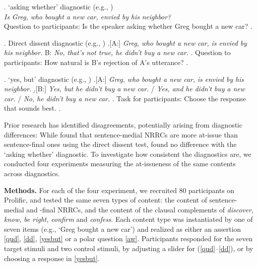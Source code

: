 \documentclass[11pt, a4paper]{article}
\newif\ifparens\parensfalse
\newcommand\pref[1]{{\parenstrue\ref{#1}}}
\begin{document}
  \ex. \label{aw}%
    `asking whether' diagnostic (e.g., \citealt{tonhauser2018projective,solstad2024cataphoric})\\
      \emph{Is Greg, who bought a new car, envied by his neighbor?}
  \\ Question to participants: Is the speaker asking whether Greg bought a new car?
  \z.

  \ex. \label{dd} Direct dissent diagnostic (e.g., \citealt{tonhauser2012diagnosing,syrett2015experimental})
    \a.[A:] \emph{Greg, who bought a new car, is envied by his neighbor.}
     \hfill 
      B: \hspace{.5em} \emph{No, that's not true, he didn't buy a new car.}
    \z.
  Question to participants: How natural is B's rejection of A's utterance?
  \z.

  \ex. \label{yesbut}%
    `yes, but' diagnostic (e.g., \citealt{xue2011correlation,destruel2015cross-linguistic})
    \a.[A:] \emph{Greg, who bought a new car, is envied by his neighbor.}
    \b.[B:] \emph{Yes, but he didn't buy a new car.} / \emph{Yes, and he didn't buy a new car.} / \emph{No, he didn't buy a new car.}
    \z.
    Task for participants: Choose the response that sounds best.
  \z.

  Prior research has identified disagreements, potentially arising from  diagnostic differences: While \citealt{syrett2015experimental} found that sentence-medial NRRCs are more at-issue than sentence-final ones using the direct dissent test, \citealt{drozdov2024projection} found no difference with the `asking whether' diagnostic. To investigate how consistent the diagnostics are, we conducted four experiments measuring the at-issueness of the same contents across diagnostics.

\vspace{.1\baselineskip} \noindent
{\bf Methods.}
  For each of the four experiment, we recruited 80 participants on Prolific, and tested the same seven types of content: the content of sentence-medial and -final NRRCs, and the content of the clausal complements of \emph{discover, know, be right, confirm} and \emph{confess}. Each content type was instantiated by one of seven items (e.g., `Greg bought a new car') and realized as either an assertion \ref{qud}, \ref{dd}, \ref{yesbut} or a polar question \ref{aw}. Participants responded for the seven target stimuli and two control stimuli, by adjusting a slider for (\pref{qud}--\pref{dd}), or by choosing a response in \ref{yesbut}.
\end{document}

